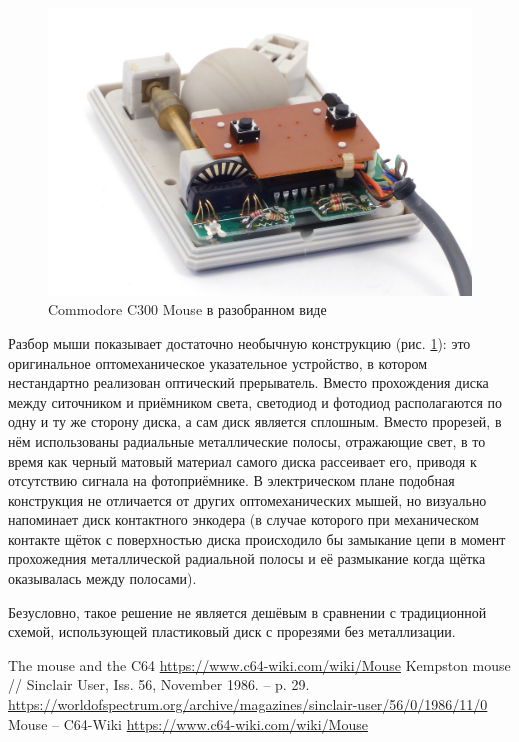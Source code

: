 \documentclass[11pt, a4paper]{article}
\begin{document}
\begin{figure}[h]
    \centering
    \includegraphics[scale=0.7]{1986_commodore_c300_mouse/cm4raz_30.jpg}
    \caption{Commodore C300 Mouse в разобранном виде}
    \label{fig:C300Inside}
\end{figure}

Разбор мыши показывает достаточно необычную конструкцию (рис. \ref{fig:C300Inside}): это оригинальное оптомеханическое указательное устройство, в котором нестандартно реализован оптический прерыватель. Вместо прохождения диска между ситочником и приёмником света, светодиод и фотодиод располагаются по одну и ту же сторону диска, а сам диск является сплошным. Вместо прорезей, в нём использованы радиальные металлические полосы, отражающие свет, в то время как черный матовый материал самого диска рассеивает его, приводя к отсутствию сигнала на фотоприёмнике. В электрическом плане подобная конструкция не отличается от других оптомеханических мышей, но визуально напоминает диск контактного энкодера (в случае которого при механическом контакте щёток с поверхностью диска происходило бы замыкание цепи в момент прохожедния металлической радиальной полосы и её размыкание когда щётка оказывалась между полосами).

Безусловно, такое решение не является дешёвым в сравнении с традиционной схемой, использующей пластиковый диск с прорезями без металлизации.

\begin{thebibliography}{9}
 The mouse and the C64 \url{https://www.c64-wiki.com/wiki/Mouse}
 Kempston mouse // Sinclair User, Iss. 56, November 1986. -- p. 29. \url{https://worldofspectrum.org/archive/magazines/sinclair-user/56/0/1986/11/0}
 Mouse -- C64-Wiki \url{https://www.c64-wiki.com/wiki/Mouse}
\end{thebibliography}
\end{document}
